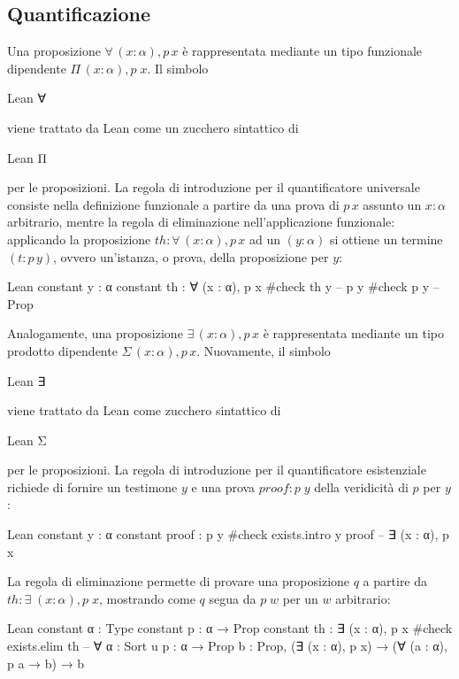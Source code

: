 \subsection{Quantificazione}
Una proposizione $\forall\,(x : \alpha), p\,x$ è rappresentata mediante un tipo funzionale dipendente $\Pi\,(x : \alpha), p\;x$. Il simbolo \begin{mintinline}{Lean} ∀ \end{mintinline} viene trattato da Lean come un zucchero sintattico di \begin{mintinline}{Lean} Π \end{mintinline} per le proposizioni. La regola di introduzione per il quantificatore universale consiste nella definizione funzionale a partire da una prova di $p\,x$ assunto un $x : \alpha$ arbitrario, mentre la regola di eliminazione nell'applicazione funzionale: applicando la proposizione $th : \forall\,(x : \alpha), p\,x$ ad un $(y : \alpha)$ si ottiene un termine $(t : p\,y)$, ovvero un'istanza, o prova, della proposizione per $y$:
\begin{code}{Lean}
constant y : α
constant th : ∀ (x : α), p x
#check th y -- p y
#check p y -- Prop
\end{code}

Analogamente, una proposizione $\exists\,(x : \alpha), p\,x$ è rappresentata mediante un tipo prodotto dipendente $\Sigma\,(x : \alpha), p\,x$. Nuovamente, il simbolo \begin{mintinline}{Lean} ∃ \end{mintinline} viene trattato da Lean come zucchero sintattico di \begin{mintinline}{Lean} Σ \end{mintinline} per le proposizioni. La regola di introduzione per il quantificatore esistenziale richiede di fornire un testimone $y$ e una prova $proof : p\;y$ della veridicità di $p$ per $y$:
\begin{code}{Lean}
constant y : α
constant proof : p y
#check exists.intro y proof -- ∃ (x : α), p x
\end{code}
La regola di eliminazione permette di provare una proposizione $q$ a partire da $th : \exists \;(x : \alpha), p\;x$, mostrando come $q$ segua da $p\;w$ per un $w$ arbitrario:
\begin{code}{Lean}
constant α : Type
constant p : α → Prop
constant th : ∃ (x : α), p x
#check exists.elim th -- ∀ {α : Sort u} {p : α → Prop} {b : Prop}, (∃ (x : α), p x) → (∀ (a : α), p a → b) → b
\end{code}

